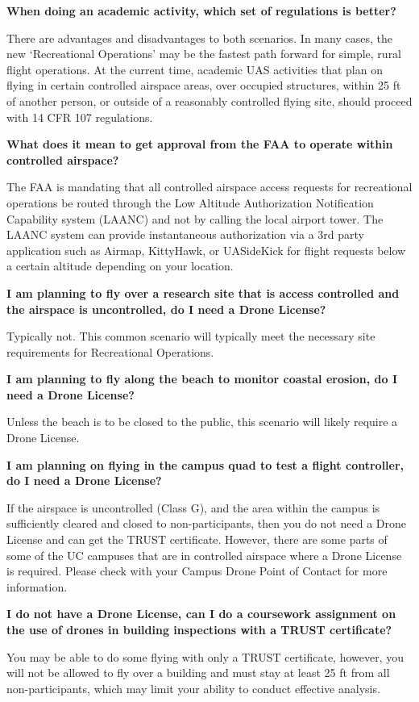 \documentclass[
  12pt,
]{book}
\begin{document}
\textbf{When doing an academic activity, which set of regulations is better?}

There are advantages and disadvantages to both scenarios. In many cases, the new `Recreational Operations' may be the fastest path forward for simple, rural flight operations. At the current time, academic UAS activities that plan on flying in certain controlled airspace areas, over occupied structures, within 25 ft of another person, or outside of a reasonably controlled flying site, should proceed with 14 CFR 107 regulations.

\textbf{What does it mean to get approval from the FAA to operate within controlled airspace?}

The FAA is mandating that all controlled airspace access requests for recreational operations be routed through the Low Altitude Authorization Notification Capability system (LAANC) and not by calling the local airport tower. The LAANC system can provide instantaneous authorization via a 3rd party application such as Airmap, KittyHawk, or UASideKick for flight requests below a certain altitude depending on your location.

\textbf{I am planning to fly over a research site that is access controlled and the airspace is uncontrolled, do I need a Drone License?}

Typically not. This common scenario will typically meet the necessary site requirements for Recreational Operations.

\textbf{I am planning to fly along the beach to monitor coastal erosion, do I need a Drone License?}

Unless the beach is to be closed to the public, this scenario will likely require a Drone License.

\textbf{I am planning on flying in the campus quad to test a flight controller, do I need a Drone License?}

If the airspace is uncontrolled (Class G), and the area within the campus is sufficiently cleared and closed to non-participants, then you do not need a Drone License and can get the TRUST certificate. However, there are some parts of some of the UC campuses that are in controlled airspace where a Drone License is required. Please check with your Campus Drone Point of Contact for more information.

\textbf{I do not have a Drone License, can I do a coursework assignment on the use of drones in building inspections with a TRUST certificate?}

You may be able to do some flying with only a TRUST certificate, however, you will not be allowed to fly over a building and must stay at least 25 ft from all non-participants, which may limit your ability to conduct effective analysis.
\end{document}
